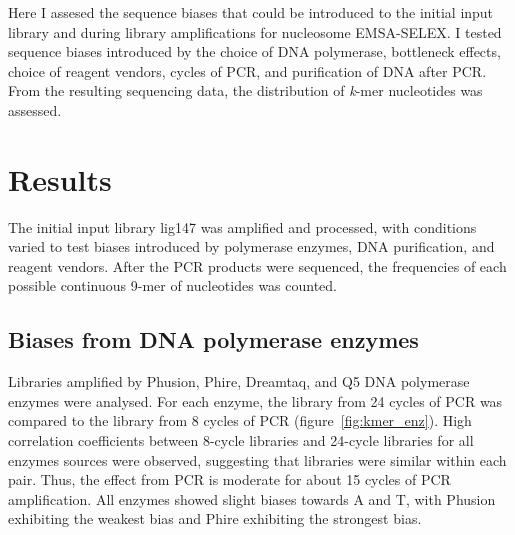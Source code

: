 \documentclass[parskip=full, numbers=noenddot]{scrbook}
\begin{document}
Here I assesed the sequence biases that could be introduced to the initial input library and during library amplifications for nucleosome EMSA-SELEX.  I tested sequence biases introduced by the choice of DNA polymerase, bottleneck effects, choice of reagent vendors, cycles of PCR, and purification of DNA after PCR.  From the resulting sequencing data, the distribution of \emph{k}-mer nucleotides was assessed.

\section{Results}
\label{sec:pcrbias_results}

The initial input library lig147 was amplified and processed, with conditions varied to test biases introduced by polymerase enzymes, DNA purification, and reagent vendors.  After the PCR products were sequenced, the frequencies of each possible continuous 9-mer of nucleotides was counted.

\subsection{Biases from DNA polymerase enzymes}
\label{ssec:pcrbias_result_enz}

Libraries amplified by Phusion, Phire, Dreamtaq, and Q5 DNA polymerase enzymes were analysed.  For each enzyme, the library from 24 cycles of PCR was compared to the library from 8 cycles of PCR (figure~\ref{fig:kmer_enz}).  High correlation coefficients between 8-cycle libraries and 24-cycle libraries for all enzymes sources were observed, suggesting that libraries were similar within each pair.  Thus, the effect from PCR is moderate for about 15 cycles of PCR amplification.  All enzymes showed slight biases towards A and T, with Phusion exhibiting the weakest bias and Phire exhibiting the strongest bias.
\end{document}
